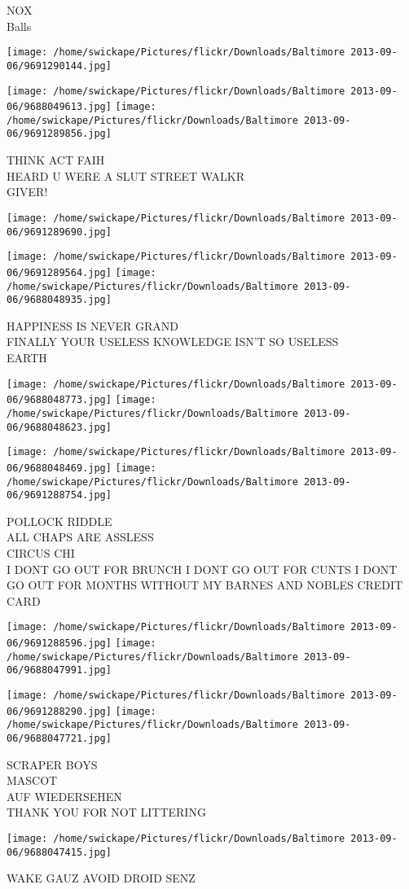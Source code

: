 \documentclass[10pt,letterpaper]{article}
\begin{document}
NOX\\
Balls
\pagebreak

\texttt{[image: /home/swickape/Pictures/flickr/Downloads/Baltimore 2013-09-06/9691290144.jpg]}

\vspace{0.25in}
\texttt{[image: /home/swickape/Pictures/flickr/Downloads/Baltimore 2013-09-06/9688049613.jpg]}
\texttt{[image: /home/swickape/Pictures/flickr/Downloads/Baltimore 2013-09-06/9691289856.jpg]}

THINK ACT FAIH\\
HEARD U WERE A SLUT STREET WALKR\\
GIVER!
\pagebreak

\texttt{[image: /home/swickape/Pictures/flickr/Downloads/Baltimore 2013-09-06/9691289690.jpg]}

\vspace{0.25in}
\texttt{[image: /home/swickape/Pictures/flickr/Downloads/Baltimore 2013-09-06/9691289564.jpg]}
\texttt{[image: /home/swickape/Pictures/flickr/Downloads/Baltimore 2013-09-06/9688048935.jpg]}

HAPPINESS IS NEVER GRAND\\
FINALLY YOUR USELESS KNOWLEDGE ISN'T SO USELESS\\
EARTH
\pagebreak

\texttt{[image: /home/swickape/Pictures/flickr/Downloads/Baltimore 2013-09-06/9688048773.jpg]}
\texttt{[image: /home/swickape/Pictures/flickr/Downloads/Baltimore 2013-09-06/9688048623.jpg]}

\texttt{[image: /home/swickape/Pictures/flickr/Downloads/Baltimore 2013-09-06/9688048469.jpg]}
\texttt{[image: /home/swickape/Pictures/flickr/Downloads/Baltimore 2013-09-06/9691288754.jpg]}

POLLOCK RIDDLE\\
ALL CHAPS ARE ASSLESS\\
CIRCUS CHI\\
I DONT GO OUT FOR BRUNCH I DONT GO OUT FOR CUNTS I DONT GO OUT FOR MONTHS WITHOUT MY BARNES AND NOBLES CREDIT CARD
\pagebreak

\texttt{[image: /home/swickape/Pictures/flickr/Downloads/Baltimore 2013-09-06/9691288596.jpg]}
\texttt{[image: /home/swickape/Pictures/flickr/Downloads/Baltimore 2013-09-06/9688047991.jpg]}

\texttt{[image: /home/swickape/Pictures/flickr/Downloads/Baltimore 2013-09-06/9691288290.jpg]}
\texttt{[image: /home/swickape/Pictures/flickr/Downloads/Baltimore 2013-09-06/9688047721.jpg]}

SCRAPER BOYS\\
MASCOT\\
AUF WIEDERSEHEN\\
THANK YOU FOR NOT LITTERING
\pagebreak

\texttt{[image: /home/swickape/Pictures/flickr/Downloads/Baltimore 2013-09-06/9688047415.jpg]}

WAKE GAUZ AVOID DROID SENZ
\pagebreak
\end{document}
